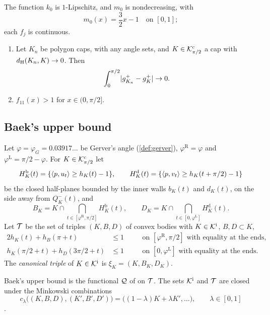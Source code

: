 The function $k_0$ is $1$-Lipschitz, and $m_0$ is nondecreasing, with
\[
  m_0(x)=\frac32x-1\quad\text{on }[0,1];
\]
each $f_j$ is continuous.

\begin{fact}\label{fact:iteration}
\begin{enumerate}[label=(\alph*)]
\item\label{fact:iteration:arms} Let $K_n$ be polygon caps, with any angle sets,
and $K\in\mathcal{K}^{\mathrm{c}}_{\pi/2}$ a cap with $d_{\mathrm{H}}(K_n,K)\to0$. Then
\[
  \int_0^{\pi/2}\lvert g_{K_n}^+-g_K^+\rvert\to0.
\]
\item\label{fact:iteration:eleven} $f_{11}(x)>1$ for $x\in(0,\pi/2]$.
\end{enumerate}
\end{fact}

\subsection{Baek's upper bound}\label{sec:Q}

\begin{definition}\label{def:triples}
Let $\varphi=\varphi_G=0.03917\ldots$ be Gerver's angle (\cref{def:gerver}),
$\varphi^{\mathrm R}=\varphi$ and $\varphi^{\mathrm L}=\pi/2-\varphi$. For
$K\in\mathcal{K}^{\mathrm{c}}_{\pi/2}$ let
\[
  H^{\mathrm b}_K(t)=\{\langle p,u_t\rangle\ge h_K(t)-1\},\qquad
  H^{\mathrm d}_K(t)=\{\langle p,v_t\rangle\ge h_K(t+\pi/2)-1\}
\]
be the closed half-planes bounded by the inner walls $b_K(t)$ and $d_K(t)$, on
the side away from $Q^-_K(t)$, and
\[
  B_K=K\cap\bigcap_{t\in[\varphi^{\mathrm R},\pi/2]}H^{\mathrm b}_K(t),\qquad
  D_K=K\cap\bigcap_{t\in[0,\varphi^{\mathrm L}]}H^{\mathrm d}_K(t).
\]
Let $\mathcal{T}$ be the set of triples $(K,B,D)$ of convex bodies with $K\in\mathcal{K}^{\mathrm{i}}$,
$B,D\subset K$,
\begin{alignat*}{2}
  h_K(t)+h_B(\pi+t)&\le1&\quad&\text{on $[\varphi^{\mathrm R},\pi/2]$ with
    equality at the ends,}\\
  h_K(\pi/2+t)+h_D(3\pi/2+t)&\le1&&\text{on $[0,\varphi^{\mathrm L}]$ with
    equality at the ends.}
\end{alignat*}
The \emph{canonical triple} of $K\in\mathcal{K}^{\mathrm{i}}$ is $\xi_K=(K,B_K,D_K)$.
\end{definition}

Baek's upper bound is the functional $\mathcal{Q}$ of  on $\mathcal{T}$. The
sets $\mathcal{K}^{\mathrm{i}}$ and $\mathcal{T}$ are closed under the Minkowski combinations
\[
  c_\lambda\bigl((K,B,D),(K',B',D')\bigr)
    =\bigl((1-\lambda)K+\lambda K',\dots\bigr),\qquad\lambda\in[0,1]
\]
.


